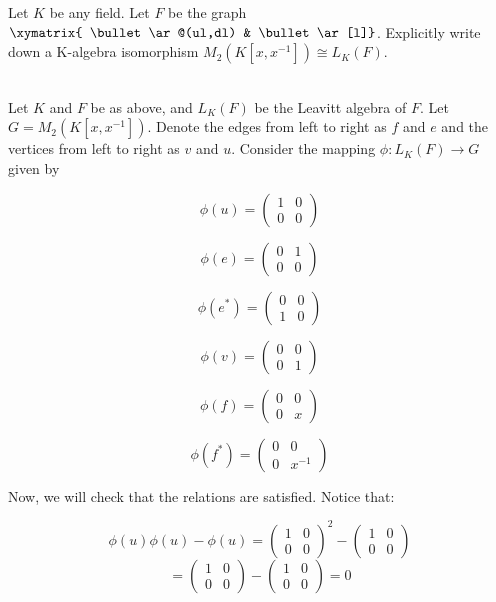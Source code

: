 Let $K$ be any field. Let $F$ be the graph \ \ \  \ 
$\xymatrix{ \bullet \ar@(ul,dl)  & \bullet \ar[l]}$. Explicitly write down a K-algebra isomorphism 
$M_2(K[x,x^{-1}])\cong L_K(F)$.\\

\begin{solution}\renewcommand{\qedsymbol}{}\ \\
    Let $K$ and $F$ be as above, and $L_K(F)$ be the Leavitt algebra of $F$. Let $G=M_2(K[x,x^{-1}])$.
    Denote the edges from left to right as $f$ and $e$ and the vertices from left to right as $v$ and
    $u$. Consider the mapping $\phi:L_K(F)\rightarrow G$ given by

    $$\phi(u)=\left(\begin{array}{cc} 1 & 0 \\ 0 & 0 \end{array}\right)$$

    $$\phi(e)=\left(\begin{array}{cc} 0 & 1 \\ 0 & 0 \end{array}\right)$$

    $$\phi(e^*)=\left(\begin{array}{cc} 0 & 0 \\ 1 & 0 \end{array}\right)$$

    $$\phi(v)=\left(\begin{array}{cc} 0 & 0 \\ 0 & 1 \end{array}\right)$$

    $$\phi(f)=\left(\begin{array}{cc} 0 & 0 \\ 0 & x \end{array}\right)$$

    $$\phi(f^*)=\left(\begin{array}{cc} 0 & 0 \\ 0 & x^{-1} \end{array}\right)$$

    Now, we will check that the relations are satisfied. Notice that:

    $$\phi(u)\phi(u)-\phi(u)=\left(\begin{array}{cc} 1 & 0 \\ 0 & 0 \end{array}\right)^2-
    \left(\begin{array}{cc} 1 & 0 \\ 0 & 0 \end{array}\right)$$
    $$=\left(\begin{array}{cc} 1 & 0 \\ 0 & 0 \end{array}\right)-
    \left(\begin{array}{cc} 1 & 0 \\ 0 & 0 \end{array}\right)=0$$


\end{solution}
